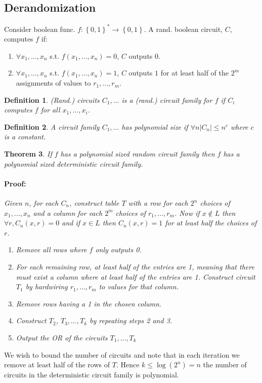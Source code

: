 \documentclass[12pt]{article}
\newtheorem{thm}{Theorem}[section]
\newtheorem{dfn}[thm]{Definition}
\begin{document}
\subsection*{Derandomization}
Consider boolean func. $f : \left\{ 0,1 \right\}^* \rightarrow \left\{ 0,1 \right\}$. A rand. boolean circuit, $C$, computes $f$ if:
\begin{enumerate}
\item $\forall x_1, \hdots, x_n$ s.t. $f(x_1, \hdots, x_n) = 0$, $C$ outputs $0$.
\item $\forall x_1, \hdots, x_n$ s.t. $f(x_1, \hdots, x_n) = 1$, $C$ outputs $1$ for at least half of the $2^m$ assignments of values to $r_1, \hdots, r_m$.\\
\end{enumerate} 
\begin{dfn}
(Rand.) circuits $C_1, \hdots$ is a (rand.) circuit family for $f$ if $C_i$ computes $f$ for all $x_1, \hdots, x_i$. \\
\end{dfn}

\begin{dfn}
A circuit family $C_1, \hdots$ has polynomial size if $\forall n \left| C_n \right| \leq n^c$ where $c$ is a constant. \\
\end{dfn}

\begin{thm}
If $f$ has a polynomial sized random circuit family then $f$ has a polynomial sized deterministic circuit family.

\paragraph{Proof:} Given $n$, for each $C_n$, construct table $T$ with a row for each $2^n$ choices of $x_1, \hdots, x_n$ and a column for each $2^m$ choices of $r_1, \hdots, r_m$. Now if $x \not\in L$ then $\forall r, C_n(x,r) = 0$ and if $x \in L$ then $C_{n}(x,r) = 1$ for at least half the choices of $r$.
\begin{enumerate}
\item Remove all rows where $f$ only outputs 0.
\item For each remaining row, at least half of the entries are 1, meaning that there must exist a column where at least half of the entries are 1. Construct circuit $T_1$ by hardwiring $r_1, \hdots, r_m$ to values for that column.
\item Remove rows having a 1 in the chosen column.
\item Construct $T_2$, $T_3, \hdots, T_k$ by repeating steps 2 and 3.
\item Output the OR of the circuits $T_1, \hdots, T_k$
\end{enumerate}
\end{thm}
We wish to bound the number of circuits and note that in each iteration we remove at least half of the rows of $T$. Hence $k \leq \log(2^n) = n$ the number of circuits in the deterministic circuit family is polynomial.
\end{document}
